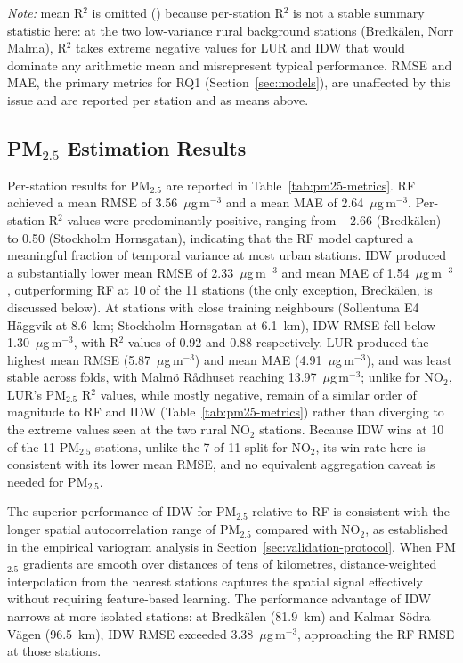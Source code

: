 \documentclass[11pt,a4paper]{article}
\let\oldsubsection\subsection
\renewcommand{\subsection}{\FloatBarrier\oldsubsection}
\begin{document}
\begin{table}[htbp]
{\footnotesize \textit{Note:} mean R$^2$ is omitted (\textemdash) because per-station R$^2$ is not a stable summary statistic here: at the two low-variance rural background stations (Bredkälen, Norr Malma), R$^2$ takes extreme negative values for LUR and IDW that would dominate any arithmetic mean and misrepresent typical performance. RMSE and MAE, the primary metrics for RQ1 (Section~\ref{sec:models}), are unaffected by this issue and are reported per station and as means above.}
\end{table}

\subsection{PM\texorpdfstring{$_{2.5}$}{2.5} Estimation Results}
\label{sec:pm25-results}

Per-station results for PM$_{2.5}$ are reported in Table~\ref{tab:pm25-metrics}. RF achieved a mean RMSE of 3.56~$\mu$g\,m$^{-3}$ and a mean MAE of 2.64~$\mu$g\,m$^{-3}$. Per-station R$^2$ values were predominantly positive, ranging from $-$2.66 (Bredkälen) to 0.50 (Stockholm Hornsgatan), indicating that the RF model captured a meaningful fraction of temporal variance at most urban stations. IDW produced a substantially lower mean RMSE of 2.33~$\mu$g\,m$^{-3}$ and mean MAE of 1.54~$\mu$g\,m$^{-3}$, outperforming RF at 10 of the 11 stations (the only exception, Bredkälen, is discussed below). At stations with close training neighbours (Sollentuna E4 H\"{a}ggvik at 8.6~km; Stockholm Hornsgatan at 6.1~km), IDW RMSE fell below 1.30~$\mu$g\,m$^{-3}$, with R$^2$ values of 0.92 and 0.88 respectively. LUR produced the highest mean RMSE (5.87~$\mu$g\,m$^{-3}$) and mean MAE (4.91~$\mu$g\,m$^{-3}$), and was least stable across folds, with Malmö Rådhuset reaching 13.97~$\mu$g\,m$^{-3}$; unlike for NO$_2$, LUR's PM$_{2.5}$ R$^2$ values, while mostly negative, remain of a similar order of magnitude to RF and IDW (Table~\ref{tab:pm25-metrics}) rather than diverging to the extreme values seen at the two rural NO$_2$ stations. Because IDW wins at 10 of the 11 PM$_{2.5}$ stations, unlike the 7-of-11 split for NO$_2$, its win rate here is consistent with its lower mean RMSE, and no equivalent aggregation caveat is needed for PM$_{2.5}$.

The superior performance of IDW for PM$_{2.5}$ relative to RF is consistent with the longer spatial autocorrelation range of PM$_{2.5}$ compared with NO$_2$, as established in the empirical variogram analysis in Section~\ref{sec:validation-protocol}. When PM$_{2.5}$ gradients are smooth over distances of tens of kilometres, distance-weighted interpolation from the nearest stations captures the spatial signal effectively without requiring feature-based learning. The performance advantage of IDW narrows at more isolated stations: at Bredkälen (81.9~km) and Kalmar Södra Vägen (96.5~km), IDW RMSE exceeded 3.38~$\mu$g\,m$^{-3}$, approaching the RF RMSE at those stations.
\end{document}

